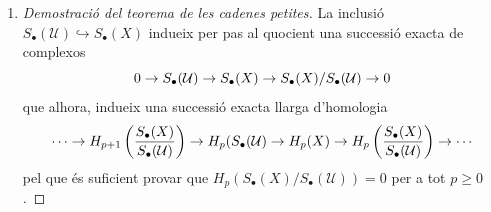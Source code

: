 \documentclass[../main.tex]{subfiles}
\begin{document}
\begin{enumerate}
\begin{proof}
    Podem suposar que $z = \sigma:\Delta^p\rightarrow X$. Com $\{\overset{\circ}{U_i}\}_{i\in I}$ és un recobriment de $X$, $\{\sigma^{-1}(\overset{\circ}{U_i})\}_{i\in I}$ és recobriment de $\Delta^p$. Com $\Delta^p$ és espai mètric compacte, $\exists\lambda>0$ nombre de Lebesgue del recobriment. Sigui $n$ suficientment gran tal que $\left(\frac{p}{p+1}\right)^n<\lambda$. Aleshores $\mathrm{diam}(\mathrm{sd}^n(\mathrm{id}_p))<\lambda$. Tots els símplexs de $\mathrm{sd}^n(\mathrm{id}_p)$ són a dins d'algun $\sigma^{-1}(\overset{\circ}{U_i})$. Aplicar $\sigma$ i ja està.
    \end{proof}
    
    \begin{coro}
    El morfisme de complexos de cadenes $\mathrm{sd}_\bullet^X:S_\bullet(X)\rightarrow X_\bullet(X)$ indueix
    \begin{equation}
    \notag
    H_p(X)\rightarrow H_p(X)\quad\forall p\geq 0
    \end{equation}
    i pel teorema d'abans això és l'aplicació identitat.
    \end{coro}


    \begin{nota}
    $\mathrm{sd}_\bullet\sim \mathrm{id}$ on la relació és d'homotopia. D'aquí, $(\mathrm{sd}_\bullet)^n = \mathrm{sd}_\bullet\circ(\mathrm{sd}_\bullet)^{n-1}\sim \mathrm{id}$. És a dir, si posem $s = \mathrm{sd}_\bullet$ i $1 = \mathrm{id}_{S_\bullet(X)}$, tenim
    \begin{equation}
    \notag
    (s^n-1) = (\underbrace{s^{n-1}+s^{n-2}+\cdots+1}_g)(s-1=
    \end{equation}
    i així això és igual a 
    \begin{equation}
    \notag
    g(s-1) = g(\partial h+h\partial) = (gh)\partial + \partial(gh)
    \end{equation}
    \end{nota}
    
    \item \begin{proof}[Demostració del teorema de les cadenes petites]
    La inclusió $S_\bullet(\mathcal{U})\hookrightarrow S_\bullet(X)$ indueix per pas al quocient una successió exacta de complexos
    \begin{equation}
        \notag
        0\rightarrow S_\bullet(\mathcal{U})\rightarrow S_\bullet(X)\rightarrow S_\bullet(X)/S_\bullet(\mathcal{U})\rightarrow 0
    \end{equation}
    que alhora, indueix una successió exacta llarga d'homologia
    \begin{equation}
        \notag
        \cdots\rightarrow H_{p+1}\left(\frac{S_\bullet(X)}{S_\bullet(\mathcal{U})}\right)\rightarrow H_p(S_\bullet(\mathcal{U})\rightarrow H_p(X)\rightarrow H_p\left(\frac{S_\bullet(X)}{S_\bullet(\mathcal{U})}\right)\rightarrow\cdots
    \end{equation}
    pel que és suficient provar que $H_p(S_\bullet(X)/S_\bullet(\mathcal{U})) = 0$ per a tot $p\geq 0$.
    

\end{proof}
\end{enumerate}
\end{document}
